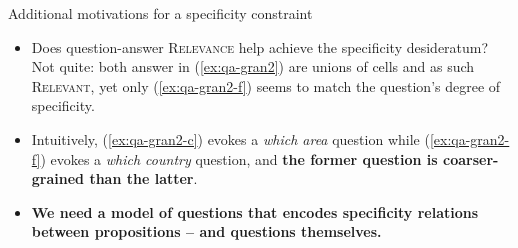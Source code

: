 \documentclass[10pt]{beamer}
\newcommand{\France}{\textbf{\textcolor{blue}{France}}}
\begin{document}
\begin{frame}{Additional motivations for a specificity constraint}
	\begin{itemize}
		\item Does question-answer \textsc{Relevance} help achieve the specificity desideratum? Not quite: both answer in (\ref{ex:qa-gran2}) are unions of cells and as such \textsc{Relevant}, yet only (\ref{ex:qa-gran2-f}) seems to match the question's degree of specificity.
	\end{itemize}
	\begin{exe}
		\label{ex:qa-gran2}
		\begin{xlist}
			\ex[\#] {\textbf{\textcolor{green}{Western Europe}}}\label{ex:qa-gran2-c}
			\ex[]  {\France, \textbf{\textcolor{blue}{the UK}}, or \textbf{\textcolor{blue}{Germany}}}\label{ex:qa-gran2-f}
		\end{xlist}
	\end{exe}\pause
	\begin{itemize}
		\item Intuitively, (\ref{ex:qa-gran2-c}) evokes a \textit{which area} question while (\ref{ex:qa-gran2-f}) evokes a \textit{which country} question, and \textbf{the former question is coarser-grained than the latter}.\pause
		\item \textbf{We need a model of questions that encodes specificity relations between propositions -- and questions themselves.}
	\end{itemize}
\end{frame}
\end{document}
